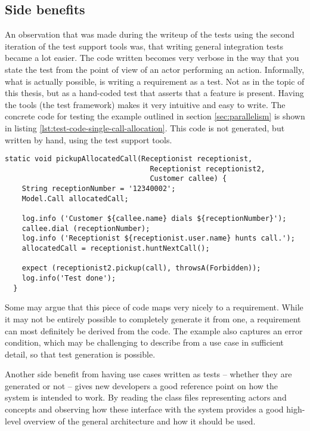 \subsection{Side benefits}
An observation that was made during the writeup of the tests using the second iteration of the test support tools was, that writing general integration tests became a lot easier. The code written becomes very verbose in the way that you state the test from the point of view of an actor performing an action. Informally, what is actually possible, is writing a requirement as a test. Not as in the topic of this thesis, but as a hand-coded test that asserts that a feature is present. Having the tools (the test framework) makes it very intuitive and easy to write. The concrete code for testing the example outlined in section \ref{sec:parallelism} is shown in listing \ref{lst:test-code-single-call-allocation}. This code is not generated, but written by hand, using the test support tools.
\begin{lstlisting}[style=Dart, caption=Test code for single call allocation,label={lst:test-code-single-call-allocation}]
  static void pickupAllocatedCall(Receptionist receptionist, 
                                  Receptionist receptionist2, 
                                  Customer callee) {
    String receptionNumber = '12340002';
    Model.Call allocatedCall;
    
    log.info ('Customer ${callee.name} dials ${receptionNumber}');
    callee.dial (receptionNumber);
    log.info ('Receptionist ${receptionist.user.name} hunts call.');
    allocatedCall = receptionist.huntNextCall();
   
    expect (receptionist2.pickup(call), throwsA(Forbidden));
    log.info('Test done');
  }
\end{lstlisting}
Some may argue that this piece of code maps very nicely to a requirement. While it may not be entirely possible to completely generate it from one, a requirement can most definitely be derived from the code. The example also captures an error condition, which may be challenging to describe from a use case in sufficient detail, so that test generation is possible.\medskip

\noindent Another side benefit from having use cases written as tests -- whether they are generated or not -- gives new developers a good reference point on how the system is intended to work. By reading the class files representing actors and concepts and observing how these interface with the system provides a good high-level overview of the general architecture and how it should be used.

